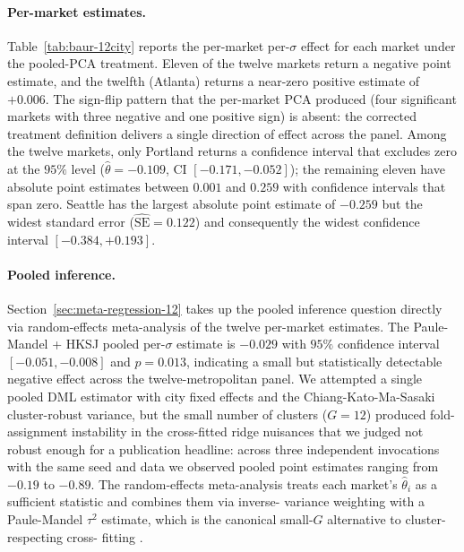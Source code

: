 \paragraph{Per-market estimates.}
Table~\ref{tab:baur-12city} reports the per-market per-$\sigma$ effect
for each market under the pooled-PCA treatment.  Eleven of the twelve
markets return a negative point estimate, and the twelfth (Atlanta)
returns a near-zero positive estimate of $+0.006$. The sign-flip
pattern that the per-market PCA produced (four significant markets
with three negative and one positive sign) is absent: the corrected
treatment definition delivers a single direction of effect across the
panel.  Among the twelve markets, only Portland returns a confidence
interval that excludes zero at the $95\%$ level
($\hat\theta = -0.109$, CI $[-0.171, -0.052]$); the remaining eleven
have absolute point estimates between $0.001$ and $0.259$ with
confidence intervals that span zero.  Seattle has the largest absolute
point estimate of $-0.259$ but the widest standard error
($\hat{\mathrm{SE}} = 0.122$) and consequently the widest confidence
interval $[-0.384, +0.193]$.

\paragraph{Pooled inference.} Section~\ref{sec:meta-regression-12}
takes up the pooled inference question directly via random-effects
meta-analysis of the twelve per-market estimates. The Paule-Mandel +
HKSJ pooled per-$\sigma$ estimate is $-0.029$ with $95\%$ confidence
interval $[-0.051, -0.008]$ and $p = 0.013$, indicating a small but
statistically detectable negative effect across the twelve-metropolitan
panel.  We attempted a single pooled DML estimator with city fixed
effects and the Chiang-Kato-Ma-Sasaki \citep{chiang2022multiway}
cluster-robust variance, but the small number of clusters
($G = 12$) produced fold-assignment instability in the cross-fitted
ridge nuisances that we judged not robust enough for a publication
headline: across three independent invocations with the same seed and
data we observed pooled point estimates ranging from $-0.19$ to
$-0.89$. The random-effects meta-analysis treats each market's
$\hat\theta_i$ as a sufficient statistic and combines them via inverse-
variance weighting with a Paule-Mandel $\tau^2$ estimate, which is
the canonical small-$G$ alternative to cluster-respecting cross-
fitting \citep{veroniki2016methods}.

